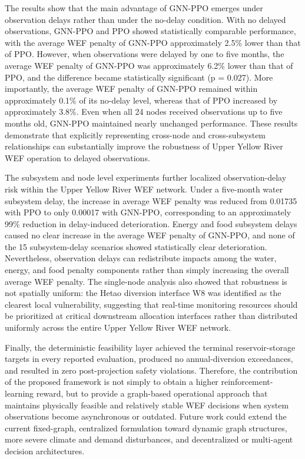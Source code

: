 \documentclass [a4paper,fleqn] {cas-dc}
\begin{document}
The results show that the main advantage of GNN-PPO emerges under observation delays rather than under the no-delay condition. With no delayed observations, GNN-PPO and PPO showed statistically comparable performance, with the average WEF penalty of GNN-PPO approximately 2.5\% lower than that of PPO. However, when observations were delayed by one to five months, the average WEF penalty of GNN-PPO was approximately 6.2\% lower than that of PPO, and the difference became statistically significant (p = 0.027). More importantly, the average WEF penalty of GNN-PPO remained within approximately 0.1\% of its no-delay level, whereas that of PPO increased by approximately 3.8\%. Even when all 24 nodes received observations up to five months old, GNN-PPO maintained nearly unchanged performance. These results demonstrate that explicitly representing cross-node and cross-subsystem relationships can substantially improve the robustness of Upper Yellow River WEF operation to delayed observations.

The subsystem and node level experiments further localized observation-delay risk within the Upper Yellow River WEF network. Under a five-month water subsystem delay, the increase in average WEF penalty was reduced from 0.01735 with PPO to only 0.00017 with GNN-PPO, corresponding to an approximately 99\% reduction in delay-induced deterioration. Energy and food subsystem delays caused no clear increase in the average WEF penalty of GNN-PPO, and none of the 15 subsystem-delay scenarios showed statistically clear deterioration. Nevertheless, observation delays can redistribute impacts among the water, energy, and food penalty components rather than simply increasing the overall average WEF penalty. The single-node analysis also showed that robustness is not spatially uniform: the Hetao diversion interface W8 was identified as the clearest local vulnerability, suggesting that real-time monitoring resources should be prioritized at critical downstream allocation interfaces rather than distributed uniformly across the entire Upper Yellow River WEF network.

Finally, the deterministic feasibility layer achieved the terminal reservoir-storage targets in every reported evaluation, produced no annual-diversion exceedances, and resulted in zero post-projection safety violations. Therefore, the contribution of the proposed framework is not simply to obtain a higher reinforcement-learning reward, but to provide a graph-based operational approach that maintains physically feasible and relatively stable WEF decisions when system observations become asynchronous or outdated. Future work could extend the current fixed-graph, centralized formulation toward dynamic graph structures, more severe climate and demand disturbances, and decentralized or multi-agent decision architectures.
\end{document}
